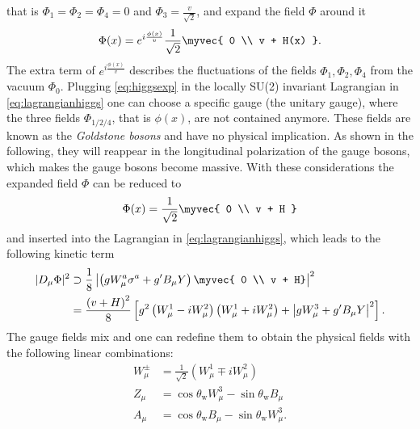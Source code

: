 that is $\Phi_1 = \Phi_2 = \Phi_4 = 0$ and $\Phi_3 = \frac{v}{\sqrt{2}}$, 
and expand the field $\Phi$ around it
\begin{equation}
  \Phi(x) = e^{i\frac{\phi(x)}{v}}\frac{1}{\sqrt{2}} \myvec{ 0 \\ v + H(x) }.
    \label{eq:higgsexp}
\end{equation}
The extra term of $e^{i\frac{\phi(x)}{v}}$ describes the fluctuations of the fields $\Phi_1, \Phi_2, \Phi_4$ from the vacuum $\Phi_0$.
Plugging \cref{eq:higgsexp} in the locally SU(2) invariant Lagrangian in \cref{eq:lagrangianhiggs} one can choose a specific gauge (the unitary gauge), where the three fields $\Phi_{1/2/4}$, that is $\phi(x)$, are not contained anymore. These fields are known as the \emph{Goldstone bosons} and have no physical implication. As shown in the following, they will reappear in the longitudinal polarization of the gauge bosons, which makes the gauge bosons become massive.
With these considerations the expanded field $\Phi$ can be reduced to
\begin{equation}
  \Phi(x) = \frac{1}{\sqrt{2}} \myvec{ 0 \\ v + H }
\end{equation}
and inserted into the Lagrangian in \cref{eq:lagrangianhiggs}, which leads to the following kinetic term
\begin{align}
  |D_\mu\Phi|^2 & \supset \frac{1}{8} \left| \left( gW_\mu^a \sigma^a+g'B_\mu Y \right) \myvec{ 0 \\ v + H} \right|^2  \label{eq:lagrangianmasspre} \\
  &= \frac{ \left( v + H \right) ^2}{8} \left[ g^2 \left( W_\mu^1 - i W_\mu^2 \right) \left( W_\mu^1 + i W_\mu^2 \right) + \left| g W_\mu^3 + g' B_\mu Y \right|^2 \right].
  \label{eq:lagrangianmass}
\end{align}
The gauge fields mix and one can redefine them to obtain the physical fields with the following linear combinations:
\begin{align}
  W_\mu^\pm &= \frac{1}{\sqrt{2}} \left( W_\mu^1 \mp iW_\mu^2 \right) \\
  Z_\mu &= \cos\theta_\text{w} W_\mu^3 - \sin\theta_\text{w} B_\mu \\
  A_\mu &= \cos\theta_\text{w} B_\mu - \sin\theta_\text{w} W_\mu^3.
\end{align}
